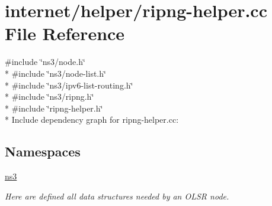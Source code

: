 \hypertarget{ripng-helper_8cc}{}\section{internet/helper/ripng-\/helper.cc File Reference}
\label{ripng-helper_8cc}
{\ttfamily \#include \char`\"{}ns3/node.\+h\char`\"{}}\\*
{\ttfamily \#include \char`\"{}ns3/node-\/list.\+h\char`\"{}}\\*
{\ttfamily \#include \char`\"{}ns3/ipv6-\/list-\/routing.\+h\char`\"{}}\\*
{\ttfamily \#include \char`\"{}ns3/ripng.\+h\char`\"{}}\\*
{\ttfamily \#include \char`\"{}ripng-\/helper.\+h\char`\"{}}\\*
Include dependency graph for ripng-\/helper.cc\+:
\subsection*{Namespaces}
\begin{DoxyCompactItemize}
\item 
 \hyperlink{namespacens3}{ns3}
\begin{DoxyCompactList}\small\item\em Here are defined all data structures needed by an O\+L\+SR node. \end{DoxyCompactList}\end{DoxyCompactItemize}
